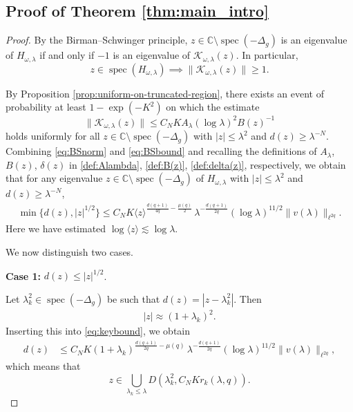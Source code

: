 \documentclass[12pt,reqno]{amsart}
\theoremstyle{definition}
\theoremstyle{remark}
\numberwithin{equation}{section}
\newcommand{\1}{\mathbbm{1}}
\newcommand{\C}{\mathbb{C}}
\DeclareMathOperator{\spec}{spec}
\begin{document}
\subsection{Proof of Theorem \ref{thm:main_intro}}
\begin{proof}
By the Birman--Schwinger principle, $z \in \mathbb{C}\setminus \spec(-\Delta_g)$ is an eigenvalue of $H_{\omega,\lambda}$ if and only if $-1$ is an eigenvalue of $\mathcal{K}_{\omega,\lambda}(z)$. In particular,
\begin{equation}\label{eq:BSnorm}
z \in \spec(H_{\omega,\lambda}) \implies \|\mathcal{K}_{\omega,\lambda}(z)\|\ge 1.
\end{equation}


By Proposition \ref{prop:uniform-on-truncated-region}, there exists an event of probability at least $1 - \exp(-K^2)$ on which the estimate
\begin{equation}\label{eq:BSbound}
\|\mathcal{K}_{\omega,\lambda}(z)\| \leq C_N K A_{\lambda}(\log\lambda)^2B(z)^{-1}
\end{equation}
holds uniformly for all $z\in\C\setminus\spec(-\Delta_g)$ with $|z|\le \lambda^2$ and $d(z)\geq \lambda^{-N}$. Combining \eqref{eq:BSnorm} and \eqref{eq:BSbound} and recalling the definitions of $A_{\lambda}$, $B(z)$, $\delta(z)$ in \eqref{def:Alambda}, \eqref{def:B(z)}, \eqref{def:delta(z)}, respectively, we obtain that for any eigenvalue $z \in \mathbb{C}\setminus \spec(-\Delta_g)$ of $H_{\omega,\lambda}$ with $|z|\le \lambda^2$ and $d(z)\geq \lambda^{-N}$,
%
\begin{align}\label{eq:keybound}
\min\{d(z), |z|^{1/2}\}
\leq C_N K \langle z\rangle^{\frac{d(q+1)}{4q}-\frac{\mu(q)}{2}}  \, \lambda^{-\frac{d(q+1)}{2q}} (\log \lambda)^{11/2} \|v(\lambda)\|_{\ell^{2q}}. 
\end{align}
Here we have estimated $\log\langle z\rangle \lesssim \log \lambda$. 


We now distinguish two cases.

\medskip
\noindent
\textbf{Case 1:} $d(z) \le |z|^{1/2}$.

Let $\lambda_k^2 \in \spec(-\Delta_g)$ be such that $d(z) = |z - \lambda_k^2|$. Then 
\begin{align}
|z|\approx (1+\lambda_k)^2.
\end{align}
Inserting this into \eqref{eq:keybound}, we obtain
\begin{align}\label{eq:d(z)leq case 1}
d(z)
&\leq C_N 
K (1+\lambda_k)^{\frac{d(q+1)}{2q}-\mu(q)}  \, \lambda^{-\frac{d(q+1)}{2q}} (\log \lambda)^{11/2} \|v(\lambda)\|_{\ell^{2q}},
\end{align}
which means that
\[
z\in \bigcup_{\lambda_k\leq \lambda} D(\lambda_k^2,C_NKr_k(\lambda,q)).
\]



\end{proof}
\end{document}
